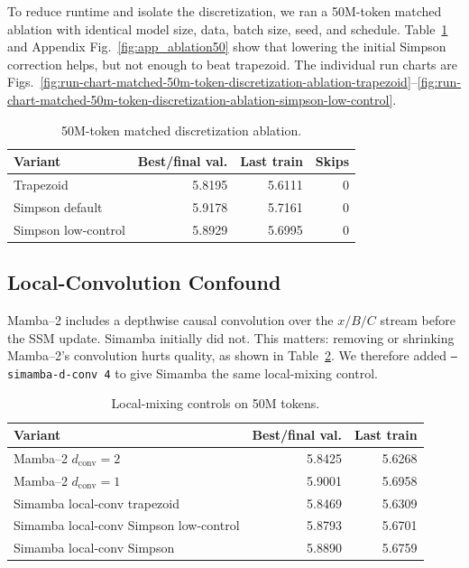 \documentclass[conference]{IEEEtran}
\newcommand{\modelname}{Simamba\xspace}
\newcommand{\mambatwo}{Mamba--2\xspace}
\begin{document}
To reduce runtime and isolate the discretization, we ran a 50M-token matched ablation with identical model size, data, batch size, seed, and schedule. Table~\ref{tab:ablation50} and Appendix Fig.~\ref{fig:app_ablation50} show that lowering the initial Simpson correction helps, but not enough to beat trapezoid. The individual run charts are Figs.~\ref{fig:run-chart-matched-50m-token-discretization-ablation-trapezoid}--\ref{fig:run-chart-matched-50m-token-discretization-ablation-simpson-low-control}.

\begin{table}[t]
\caption{50M-token matched discretization ablation.}
\label{tab:ablation50}
\centering
\begin{tabular}{lrrr}
\toprule
Variant & Best/final val. & Last train & Skips\\
\midrule
Trapezoid & 5.8195 & 5.6111 & 0\\
Simpson default & 5.9178 & 5.7161 & 0\\
Simpson low-control & 5.8929 & 5.6995 & 0\\
\bottomrule
\end{tabular}
\end{table}

\subsection{Local-Convolution Confound}

\mambatwo includes a depthwise causal convolution over the $x/B/C$ stream before the SSM update. \modelname initially did not. This matters: removing or shrinking \mambatwo's convolution hurts quality, as shown in Table~\ref{tab:local}. We therefore added \texttt{--simamba-d-conv 4} to give \modelname the same local-mixing control.

\begin{table}[t]
\caption{Local-mixing controls on 50M tokens.}
\label{tab:local}
\centering
\begin{tabular}{lrr}
\toprule
Variant & Best/final val. & Last train\\
\midrule
\mambatwo{} $d_{\mathrm{conv}}=2$ & 5.8425 & 5.6268\\
\mambatwo{} $d_{\mathrm{conv}}=1$ & 5.9001 & 5.6958\\
\modelname{} local-conv trapezoid & 5.8469 & 5.6309\\
\modelname{} local-conv Simpson low-control & 5.8793 & 5.6701\\
\modelname{} local-conv Simpson & 5.8890 & 5.6759\\
\bottomrule
\end{tabular}
\end{table}
\end{document}

